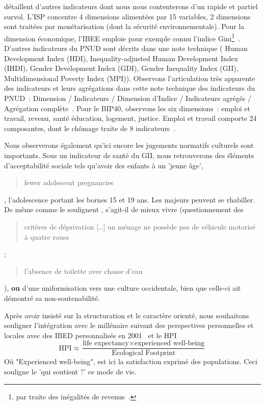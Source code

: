 \citeauthor*{gadrey_les_2012} détaillent d'autres indicateurs dont nous nous contenterons d'un rapide et partiel survol.
L'\gls{ISP} concentre 4 dimensions alimentées par 15 variables, 2 dimensions sont traitées par monétarisation (dont la sécurité environnementale).
Pour la dimension économique, l'\gls{IBEE} emploie pour exemple connu l'indice Gini\footnote{ par \citeauthor{gini_measurement_1921} traite des inégalités de revenus~\cite{gini_measurement_1921}.}~\cite[p.47]{gadrey_les_2012}.
D'autres indicateurs du \gls{PNUD}
sont décrits dans une note technique ( Human Development Index (HDI), Inequality-adjusted Human Development Index (IHDI), Gender Development Index (GDI), Gender Inequality Index (GII), Multidimensional Poverty Index (MPI)).
Observons l'articulation très apparente des indicateurs et leurs agrégations dans cette note technique des indicateurs du \gls{PNUD}~: Dimension / Indicateurs / Dimension d'Indice / Indicateurs agrégés / Agrégation complète~\cite{pnud_human_2015}.
Pour le \gls{BIP40}, observons les six dimensions~: emploi et travail, revenu, santé éducation, logement, justice. Emploi et travail comporte 24 composantes, dont le chômage traite de 8 indicateurs~\cite[p.45-46]{gadrey_les_2012}.

Nous observerons également qu'ici encore les jugements normatifs culturels sont importants.
Sous un indicateur de santé du GII, nous retrouverons des éléments d'acceptabilité sociale tels qu'avoir des enfants à un 'jeune âge',
\blockcquote{pnud_human_2015}{fewer adolescent pregnancies},
l'adolescence portant les bornes 15 et 19 ans.
Les majeurs peuvent se rhabiller.
De même comme le soulignent \citeauthor[p.36 ; p.92]{gadrey_les_2012}, s'agit-il de mieux vivre (questionnement des \blockcquote{gadrey_les_2012}{critères de déprivation [\dots] un ménage ne possède pas de véhicule motorisé à quatre roues} ; \blockcquote{gadrey_les_2012}{l'absence de toilette avec chasse d'eau}), \textbf{ou }d'une uniformisation vers une culture occidentale, bien que celle-ci ait démontré sa non-soutenabilité. %

Après avoir insisté sur la structuration et le caractère orienté, nous souhaitons souligner l'intégration avec le millénaire suivant des perspectives personnelles et locales avec
des \gls{IBED} personnalisés en 2001~\cite[p.70]{gadrey_les_2012}
et le \gls{HPI}~\cite[p.86-87]{gadrey_les_2012}~\cite{centre_for_well-being_about_????}
\begin{equation}\text{HPI} \approx \frac{\text{life expectancy} \times \text{experienced well-being}}{\text{Ecological Footprint}}
\end{equation}
Où "Experienced well-being", est ici la satisfaction exprimé des populations.
Ceci souligne le 'qui soutient ?' ce mode de vie.


